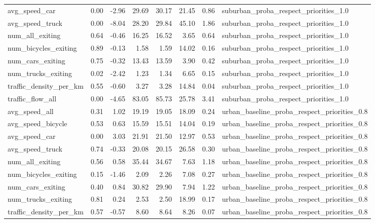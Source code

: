 \begin{table}[ht]
\begin{tabular}{lrrrrrrl}
  avg\_speed\_car & 0.00 & -2.96 & 29.69 & 30.17 & 21.45 & 0.86 & suburban\_proba\_respect\_priorities\_1.0 \\ 
  avg\_speed\_truck & 0.00 & -8.04 & 28.20 & 29.84 & 45.10 & 1.86 & suburban\_proba\_respect\_priorities\_1.0 \\ 
  num\_all\_exiting & 0.64 & -0.46 & 16.25 & 16.52 & 3.65 & 0.64 & suburban\_proba\_respect\_priorities\_1.0 \\ 
  num\_bicycles\_exiting & 0.89 & -0.13 & 1.58 & 1.59 & 14.02 & 0.16 & suburban\_proba\_respect\_priorities\_1.0 \\ 
  num\_cars\_exiting & 0.75 & -0.32 & 13.43 & 13.59 & 3.90 & 0.42 & suburban\_proba\_respect\_priorities\_1.0 \\ 
  num\_trucks\_exiting & 0.02 & -2.42 & 1.23 & 1.34 & 6.65 & 0.15 & suburban\_proba\_respect\_priorities\_1.0 \\ 
  traffic\_density\_per\_km & 0.55 & -0.60 & 3.27 & 3.28 & 14.84 & 0.04 & suburban\_proba\_respect\_priorities\_1.0 \\ 
  traffic\_flow\_all & 0.00 & -4.65 & 83.05 & 85.73 & 25.78 & 3.41 & suburban\_proba\_respect\_priorities\_1.0 \\ 
  avg\_speed\_all & 0.31 & 1.02 & 19.19 & 19.05 & 18.09 & 0.24 & urban\_baseline\_proba\_respect\_priorities\_0.8 \\ 
  avg\_speed\_bicycle & 0.53 & 0.63 & 15.59 & 15.51 & 14.04 & 0.19 & urban\_baseline\_proba\_respect\_priorities\_0.8 \\ 
  avg\_speed\_car & 0.00 & 3.03 & 21.91 & 21.50 & 12.97 & 0.53 & urban\_baseline\_proba\_respect\_priorities\_0.8 \\ 
  avg\_speed\_truck & 0.74 & -0.33 & 20.08 & 20.15 & 26.58 & 0.30 & urban\_baseline\_proba\_respect\_priorities\_0.8 \\ 
  num\_all\_exiting & 0.56 & 0.58 & 35.44 & 34.67 & 7.63 & 1.18 & urban\_baseline\_proba\_respect\_priorities\_0.8 \\ 
  num\_bicycles\_exiting & 0.15 & -1.46 & 2.09 & 2.26 & 7.08 & 0.27 & urban\_baseline\_proba\_respect\_priorities\_0.8 \\ 
  num\_cars\_exiting & 0.40 & 0.84 & 30.82 & 29.90 & 7.94 & 1.22 & urban\_baseline\_proba\_respect\_priorities\_0.8 \\ 
  num\_trucks\_exiting & 0.81 & 0.24 & 2.53 & 2.50 & 18.99 & 0.17 & urban\_baseline\_proba\_respect\_priorities\_0.8 \\ 
  traffic\_density\_per\_km & 0.57 & -0.57 & 8.60 & 8.64 & 8.26 & 0.07 & urban\_baseline\_proba\_respect\_priorities\_0.8 \\ 

\end{tabular}
\end{table}
